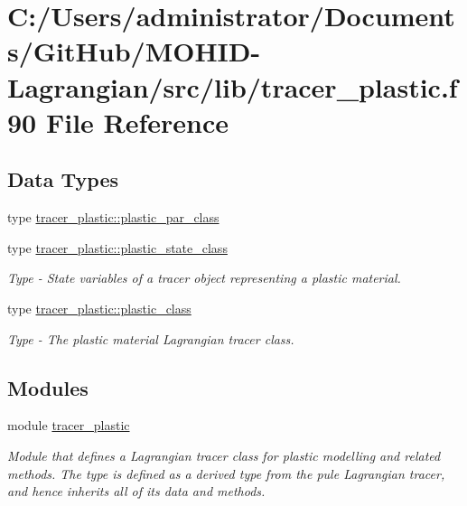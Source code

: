 \hypertarget{tracer__plastic_8f90}{}\section{C\+:/\+Users/administrator/\+Documents/\+Git\+Hub/\+M\+O\+H\+I\+D-\/\+Lagrangian/src/lib/tracer\+\_\+plastic.f90 File Reference}
\label{tracer__plastic_8f90}
\subsection*{Data Types}
\begin{DoxyCompactItemize}
\item 
type \mbox{\hyperlink{structtracer__plastic_1_1plastic__par__class}{tracer\+\_\+plastic\+::plastic\+\_\+par\+\_\+class}}
\item 
type \mbox{\hyperlink{structtracer__plastic_1_1plastic__state__class}{tracer\+\_\+plastic\+::plastic\+\_\+state\+\_\+class}}
\begin{DoxyCompactList}\small\item\em Type -\/ State variables of a tracer object representing a plastic material. \end{DoxyCompactList}\item 
type \mbox{\hyperlink{structtracer__plastic_1_1plastic__class}{tracer\+\_\+plastic\+::plastic\+\_\+class}}
\begin{DoxyCompactList}\small\item\em Type -\/ The plastic material Lagrangian tracer class. \end{DoxyCompactList}\end{DoxyCompactItemize}
\subsection*{Modules}
\begin{DoxyCompactItemize}
\item 
module \mbox{\hyperlink{namespacetracer__plastic}{tracer\+\_\+plastic}}
\begin{DoxyCompactList}\small\item\em Module that defines a Lagrangian tracer class for plastic modelling and related methods. The type is defined as a derived type from the pule Lagrangian tracer, and hence inherits all of it\textquotesingle{}s data and methods. \end{DoxyCompactList}\end{DoxyCompactItemize}
